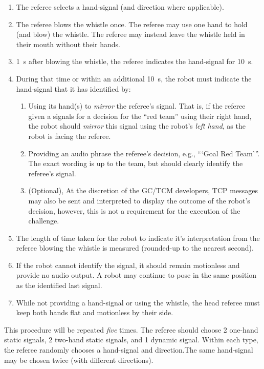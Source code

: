         \begin{enumerate}
            
            \item The referee selects a hand-signal (and direction where applicable).
            \item The referee blows the whistle once. The referee may use one hand to hold (and blow) the whistle. The referee may instead leave the whistle held in their mouth without their hands.
            \item \qty{1}{\second} after blowing the whistle, the referee indicates the hand-signal for \qty{10}{\second}.
            \item During that time or within an additional \qty{10}{\second}, the robot must indicate the hand-signal that it has identified by:
            \begin{enumerate}
                \item Using its hand(s) to \emph{mirror} the referee's signal. That is, if the referee given a signals for a decision for the ``red team'' using their right hand, the robot should \emph{mirror} this signal using the robot's \emph{left hand}, as the robot is facing the referee.
                \item Providing an audio phrase the referee's decision, e.g., ```Goal Red Team'''.  The exact wording is up to the team, but should clearly identify the referee's signal.
                \item (Optional), At the discretion of the GC/TCM developers, TCP messages may also be sent and interpreted to display the outcome of the robot's decision, however, this is not a requirement for the execution of the challenge.
            \end{enumerate}
            \item The length of time taken for the robot to indicate it's interpretation from the referee blowing the whistle is measured (rounded-up to the nearest second).
            \item If the robot cannot identify the signal, it should remain motionless and provide no audio output. A robot may continue to pose in the same position as the identified last signal.
            \item While not providing a hand-signal or using the whistle, the head referee must keep both hands flat and motionless by their side.
        \end{enumerate}

        This procedure will be repeated \textit{five} times. The referee should choose 2 one-hand static signals, 2 two-hand static signals, and 1 dynamic signal. Within each type, the referee randomly chooses a hand-signal and direction.The same hand-signal may be chosen twice (with different directions).

